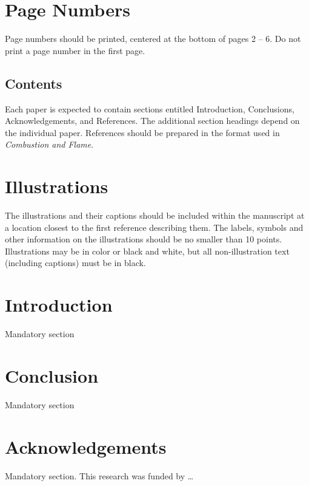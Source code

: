 \documentclass[10pt,a4paper]{ecm} %
\begin{document}
\begin{multicols}{2}
\section*{Page Numbers}
Page numbers should be printed, centered at the bottom of pages 2 – 6.
Do not print a page number in the first page.


\subsection*{Contents}
Each paper is expected to contain sections entitled Introduction, Conclusions, Acknowledgements, and References.
The additional section headings depend on the individual paper.
References should be prepared in the format used in {\it Combustion and Flame}.

\section*{Illustrations}
The illustrations and their captions should be included within the manuscript at a location closest to the first reference describing them.
The labels, symbols and other information on the illustrations should be no smaller than 10 points.
Illustrations may be in color or black and white, but all non-illustration text (including captions) must be in black.

\section*{Introduction}
Mandatory section

\section*{Conclusion}
Mandatory section

\section*{Acknowledgements}
Mandatory section.
This research was funded by \ldots

\printbibliography

\end{multicols} %
\end{document}
